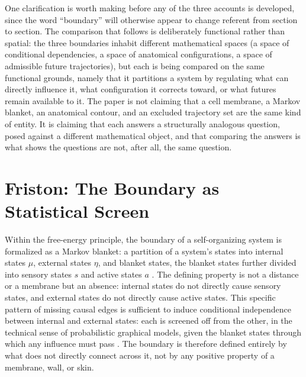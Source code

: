 \documentclass[11pt]{article}
\theoremstyle{plain}
\begin{document}
One clarification is worth making before any of the three accounts is developed, since the word ``boundary'' will otherwise appear to change referent from section to section. The comparison that follows is deliberately functional rather than spatial: the three boundaries inhabit different mathematical spaces (a space of conditional dependencies, a space of anatomical configurations, a space of admissible future trajectories), but each is being compared on the same functional grounds, namely that it partitions a system by regulating what can directly influence it, what configuration it corrects toward, or what futures remain available to it. The paper is not claiming that a cell membrane, a Markov blanket, an anatomical contour, and an excluded trajectory set are the same kind of entity. It is claiming that each answers a structurally analogous question, posed against a different mathematical object, and that comparing the answers is what shows the questions are not, after all, the same question.

\section{Friston: The Boundary as Statistical Screen}
\label{sec:friston}

Within the free-energy principle, the boundary of a self-organizing system is formalized as a Markov blanket: a partition of a system's states into internal states $\mu$, external states $\eta$, and blanket states, the blanket states further divided into sensory states $s$ and active states $a$ \citep{friston2019}. The defining property is not a distance or a membrane but an absence: internal states do not directly cause sensory states, and external states do not directly cause active states. This specific pattern of missing causal edges is sufficient to induce conditional independence between internal and external states: each is screened off from the other, in the technical sense of probabilistic graphical models, given the blanket states through which any influence must pass \citep{kirchhoff2018}. The boundary is therefore defined entirely by what does not directly connect across it, not by any positive property of a membrane, wall, or skin.
\end{document}
